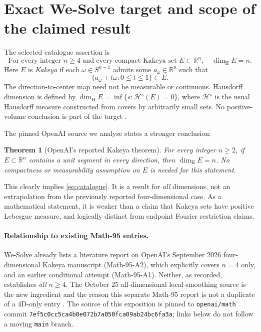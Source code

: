 \documentclass[11pt,a4paper]{article}
\numberwithin{equation}{section}
\newtheorem{theorem}{Theorem}[section]
\theoremstyle{definition}
\theoremstyle{remark}
\newcommand{\R}{\mathbb R}
\newcommand{\Hs}{\mathcal H}
\newcommand{\dimH}{\dim_{\mathrm H}}
\newcommand{\Sph}{S^{n-1}}
\newcommand{\pinsha}{7ef5c0cc5ca4b0e072b7a050fca09ab24bc6fa3a}
\begin{document}
\section{Exact We-Solve target and scope of the claimed result}
\label{sec:target}
The selected catalogue assertion is
\begin{equation}\label{eq:catalogue}
  \boxed{\text{For every integer }n\ge4\text{ and every compact Kakeya set }
         E\subset\R^n,\quad \dimH E=n.}
\end{equation}
Here $E$ is \emph{Kakeya} if each $\omega\in\Sph$ admits some
$a_\omega\in\R^n$ such that
\begin{equation}\label{eq:segment}
 \{a_\omega+t\omega:0\le t\le1\}\subset E.
\end{equation}
The direction-to-center map need not be measurable or continuous.
Hausdorff dimension is defined by
$\dimH E=\inf\{s:\Hs^s(E)=0\}$, where $\Hs^s$ is the usual
Hausdorff measure constructed from covers by arbitrarily small sets.
No positive-volume conclusion is part of the target \cite{catalogue}.

The pinned OpenAI source we analyse states a stronger conclusion:
\begin{theorem}[OpenAI's reported Kakeya theorem]\label{thm:openai-kakeya}
For every integer $n\ge2$, if $E\subset\R^n$ contains a unit
segment in every direction, then $\dimH E=n$. No compactness or
measurability assumption on $E$ is needed for this statement.
\end{theorem}
This clearly implies \eqref{eq:catalogue}. It is a result for
\emph{all} dimensions, not an extrapolation from the previously
reported four-dimensional case. As a mathematical statement, it is
weaker than a claim that Kakeya sets have positive Lebesgue measure,
and logically distinct from endpoint Fourier restriction claims.

\paragraph{Relationship to existing Math-95 entries.}
We-Solve already lists a literature report on OpenAI's September 2026
four-dimensional Kakeya manuscript (Math-95-A2), which explicitly
covers $n=4$ only, and an earlier conditional attempt (Math-95-A1).
Neither, as recorded, establishes \emph{all} $n\ge4$. The October 25
all-dimensional local-smoothing source is the new ingredient and the
reason this separate Math-95 report is not a duplicate of a 4D-only
entry \cite{catalogue}. The source of this exposition is pinned to
\texttt{openai/math} commit \texttt{\pinsha}; links below do not follow
a moving \texttt{main} branch.
\end{document}
